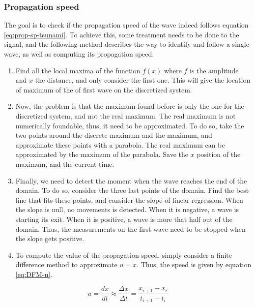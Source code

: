\documentclass[a4paper,12pt,twoside]{article}
\begin{document}
      \subsubsection{Propagation speed}
        The goal is to check if the propagation speed of the wave indeed follows equation \eqref{eq:prop-sp-tsunami}.
        To achieve this, some treatment needs to be done to the signal, and the following method describes the way to identify and follow a single wave, as well as computing its propagation speed.
        \begin{enumerate}
          \item Find all the local maxima of the function $f(x)$ where $f$ is the amplitude and $x$ the distance, and only consider the first one.
          This will give the location of maximum of the of first wave on the discretized system.
          \item Now, the problem is that the maximum found before is only the one for the discretized system, and not the real maximum.
          The real maximum is not numerically foundable, thus, it need to be approximated.
          To do so, take the two points around the discrete maximum and the maximum, and approximate these points with a parabola.
          The real maximum can be approximated by the maximum of the parabola.
          Save the $x$ position of the maximum, and the current time.
          \item Finally, we need to detect the moment when the wave reaches the end of the domain.
          To do so, consider the three last points of the domain.
          Find the best line that fits these points, and consider the slope of linear regression.
          When the slope is null, no movements is detected.
          When it is negative, a wave is starting its exit.
          When it is positive, a wave is more that half out of the domain.
          Thus, the measurements on the first wave need to be stopped when the slope gets positive.
          \item To compute the value of the propagation speed, simply consider a finite difference method to approximate $u=\dot{x}$.
          Thus, the speed is given by equation \eqref{eq:DFM-u}.
        \end{enumerate}

        \begin{equation}
          u=\frac{dx}{dt}\approx\frac{\Delta x}{\Delta t}=\frac{x_{i+1} - x_i}{t_{i+1} - t_i}
          \label{eq:DFM-u}
        \end{equation}
\end{document}
